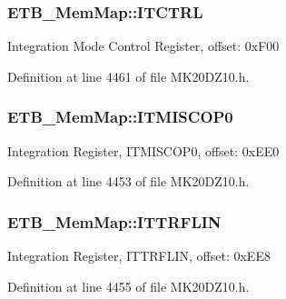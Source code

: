 \subsubsection[{\texorpdfstring{I\+T\+C\+T\+RL}{ITCTRL}}]{ E\+T\+B\+\_\+\+Mem\+Map\+::\+I\+T\+C\+T\+RL}\hypertarget{struct_e_t_b___mem_map_acf9a92d3db15cc318551da316524d21b}{}\label{struct_e_t_b___mem_map_acf9a92d3db15cc318551da316524d21b}
Integration Mode Control Register, offset\+: 0x\+F00 

Definition at line 4461 of file M\+K20\+D\+Z10.\+h.

\subsubsection[{\texorpdfstring{I\+T\+M\+I\+S\+C\+O\+P0}{ITMISCOP0}}]{ E\+T\+B\+\_\+\+Mem\+Map\+::\+I\+T\+M\+I\+S\+C\+O\+P0}\hypertarget{struct_e_t_b___mem_map_acdc0e8395d63098ffbbaa63cc05ceb7e}{}\label{struct_e_t_b___mem_map_acdc0e8395d63098ffbbaa63cc05ceb7e}
Integration Register, I\+T\+M\+I\+S\+C\+O\+P0, offset\+: 0x\+E\+E0 

Definition at line 4453 of file M\+K20\+D\+Z10.\+h.

\subsubsection[{\texorpdfstring{I\+T\+T\+R\+F\+L\+IN}{ITTRFLIN}}]{ E\+T\+B\+\_\+\+Mem\+Map\+::\+I\+T\+T\+R\+F\+L\+IN}\hypertarget{struct_e_t_b___mem_map_a15ffb02eb23af7c4ee5a13922f3f5d37}{}\label{struct_e_t_b___mem_map_a15ffb02eb23af7c4ee5a13922f3f5d37}
Integration Register, I\+T\+T\+R\+F\+L\+IN, offset\+: 0x\+E\+E8 

Definition at line 4455 of file M\+K20\+D\+Z10.\+h.

